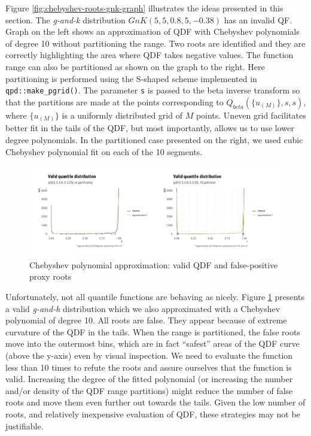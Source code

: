 \documentclass[
  12pt,
]{article}
\begin{document}
Figure \ref{fig:chebyshev-roots-gnk-graph} illustrates the ideas presented in this section. The \emph{g-and-k} distribution \(GnK(5,5,0.8,5,-0.38)\) has an invalid QF. Graph on the left shows an approximation of QDF with Chebyshev polynomials of degree 10 without partitioning the range. Two roots are identified and they are correctly highlighting the area where QDF takes negative values. The function range can also be partitioned as shown on the graph to the right. Here partitioning is performed using the S-shaped scheme implemented in \texttt{qpd::make\_pgrid()}. The parameter \texttt{s} is passed to the beta inverse transform so that the partitions are made at the points corresponding to \(Q_{beta}(\{u_{(M)} \}, s,s)\), where \(\{u_{(M)} \}\) is a uniformly distributed grid of \(M\) points. Uneven grid facilitates better fit in the tails of the QDF, but most importantly, allows us to use lower degree polynomials. In the partitioned case presented on the right, we used cubic Chebyshev polynomial fit on each of the 10 segments.

\begin{figure}

{\centering \includegraphics{ilbm_article_files/figure-latex/chebyshev-roots-gnh-graph-1} 

}

\caption{Chebyshev polynomial approximation: valid QDF and false-positive proxy roots}\label{fig:chebyshev-roots-gnh-graph}
\end{figure}

Unfortunately, not all quantile functions are behaving as nicely. Figure \ref{fig:chebyshev-roots-gnh-graph} presents a valid \emph{g-and-h} distribution which we also approximated with a Chebyshev polynomial of degree 10. All roots are false. They appear because of extreme curvature of the QDF in the tails. When the range is partitioned, the false roots move into the outermost bins, which are in fact ``safest'' areas of the QDF curve (above the y-axis) even by visual inspection. We need to evaluate the function less than 10 times to refute the roots and assure ourselves that the function is valid. Increasing the degree of the fitted polynomial (or increasing the number and/or density of the QDF range partitions) might reduce the number of false roots and move them even further out towards the tails. Given the low number of roots, and relatively inexpensive evaluation of QDF, these strategies may not be justifiable.
\end{document}
